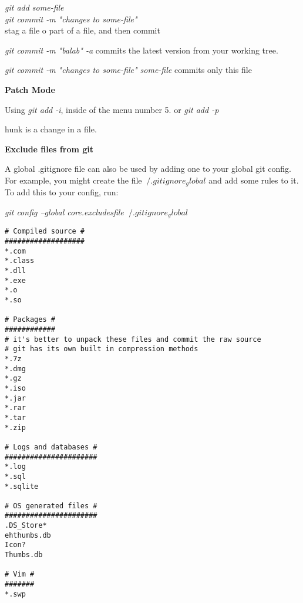 \documentclass[12pt]{article}
\newcommand \tb[1]{\textbf{#1}}
\newcommand \ti[1]{\textit{#1}}
\begin{document}
\noindent

\ti{ git add some-file \\
     git commit -m "changes to some-file" \\ }
stag a file o part of a file, and then commit

\ti{git commit -m "balab" -a}
commits the latest version from your working  tree.


\ti{git commit -m "changes to some-file" some-file}
commits only this file

\tb{Patch Mode}
 
Using \ti{git add -i}, inside of the menu number 5. or 
\ti{git add -p}

hunk is a change in a file.




\textbf{Exclude files from git}

A global .gitignore file can also be used by adding one to your 
global git config. For example, you might create the file 
$~/.gitignore_global$ and add some rules to it. To add this to your 
config, run: 

\ti{git config --global core.excludesfile $~/.gitignore_global$}


\begin{verbatim}
# Compiled source #
###################
*.com
*.class
*.dll
*.exe
*.o
*.so

# Packages #
############
# it's better to unpack these files and commit the raw source
# git has its own built in compression methods
*.7z
*.dmg
*.gz
*.iso
*.jar
*.rar
*.tar
*.zip

# Logs and databases #
######################
*.log
*.sql
*.sqlite

# OS generated files #
######################
.DS_Store*
ehthumbs.db
Icon?
Thumbs.db

# Vim #
#######
*.swp
\end{verbatim}
\end{document}
